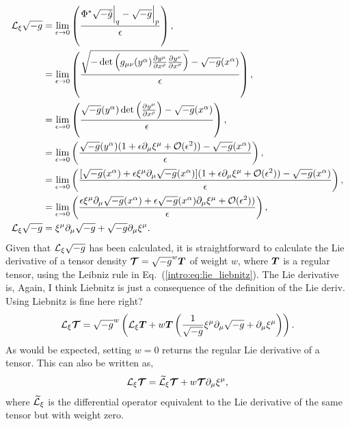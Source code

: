 \begin{align}
\mathcal{L}_\xi \sqrt{-g} &= \lim_{\epsilon\rightarrow 0 }\left( \frac{\Phi^*\sqrt{-\tilde{g}}\Big|_q-\sqrt{-g}\Big|_p}{\epsilon} \right) ,\\
&= \lim_{\epsilon\rightarrow 0 }\left( \frac{\sqrt{-\det\left(g_{\mu\nu}(y^\alpha){\frac{\partial y^\mu}{\partial x^\rho}  \frac{\partial y^\nu}{\partial x^\sigma}}\right)}-\sqrt{-g}(x^\alpha)}{\epsilon} \right) ,\\
&= \lim_{\epsilon\rightarrow 0 }\left( \frac{\sqrt{-g}(y^\alpha) \det\left(\frac{\partial y^\mu}{\partial x^\rho}\right) -\sqrt{-g}(x^\alpha)}{\epsilon} \right) ,\\
&= \lim_{\epsilon\rightarrow 0 }\left( \frac{\sqrt{-g}(y^\alpha) (1 + \epsilon \partial_\mu \xi^\mu + \mathcal{O}(\epsilon^2)) -\sqrt{-g}(x^\alpha)}{\epsilon} \right) ,\\
&= \lim_{\epsilon\rightarrow 0 }\left( \frac{[\sqrt{-g}(x^\alpha) + \epsilon \xi^\mu \partial_\mu \sqrt{-g}(x^\alpha)] (1 + \epsilon \partial_\mu \xi^\mu + \mathcal{O}(\epsilon^2)) -\sqrt{-g}(x^\alpha)}{\epsilon} \right) ,\\
&= \lim_{\epsilon\rightarrow 0 }\left( \frac{ \epsilon \xi^\mu \partial_\mu \sqrt{-g}(x^\alpha) + \epsilon \sqrt{-g}(x^\alpha)\partial_\mu \xi^\mu + \mathcal{O}(\epsilon^2))}{\epsilon}  \right) ,\\
\mathcal{L}_\xi \sqrt{-g} &= \xi^\mu \partial_\mu \sqrt{-g} + \sqrt{-g} \partial_\mu \xi^\mu.
\end{align}
Given that $\mathcal{L}_\xi \sqrt{-g}$ has been calculated, it is straightforward to calculate the Lie derivative of a tensor density $\boldsymbol{\mathcal{T}} = \sqrt{-g}^w\boldsymbol{T}$ of weight $w$, where $\boldsymbol{T}$ is a regular tensor, using the Leibniz rule in Eq.~(\ref{intro:eq:lie_liebnitz}). The Lie derivative is, \color{choral} Again, I think Liebnitz is just a consequence of the definition of the Lie deriv. Using Liebnitz is fine here right?\color{black}
\begin{equation} \label{intro:eq:Ltensordensity}
\mathcal{L}_\xi \boldsymbol{\mathcal{T}} = \sqrt{-g}^w \left( \mathcal{L}_\xi \boldsymbol{T} + w \boldsymbol{T} \left(   \frac{1}{\sqrt{-g}} \xi^\mu \partial_\mu \sqrt{-g} + \partial_\mu \xi^\mu \right) \right).
\end{equation}
As would be expected, setting $w=0$ returns the regular Lie derivative of a tensor. This can also be written as, 
\begin{equation} \label{intro:eq:Ltensordensity2}
\mathcal{L}_\xi \boldsymbol{\mathcal{T}} =  \widetilde{\mathcal{L}}_\xi \boldsymbol{\mathcal{T}} + w \boldsymbol{\mathcal{T}}  \partial_\mu \xi^\mu ,
\end{equation}
where $ \widetilde{\mathcal{L}}_\xi$ is the differential operator equivalent to the Lie derivative of the same tensor but with weight zero.





